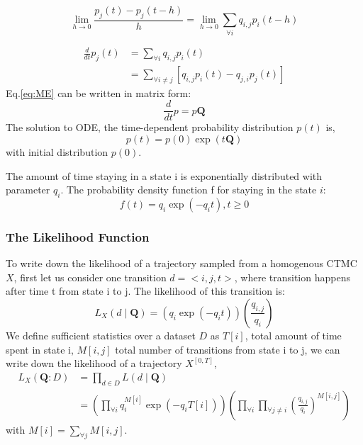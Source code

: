 \begin{equation}
\lim_{h\rightarrow 0} \frac{p_{j}(t) - p_{j}(t-h)}{h} = \lim_{h\rightarrow 0} \sum_{\forall i} q_{i,j} p_{i}(t-h)
\end{equation}

\begin{equation}
\begin{split}
\frac{d}{dt} p_{j}(t) & = \sum_{\forall i} q_{i,j} p_{i}(t) \\ & = \sum_{\forall i \neq j}\left[  q_{i,j} p_{i}(t) - q_{j,i} p_{j}(t) \right]
\end{split}
\label{eq:ME}
\end{equation}
Eq.\ref{eq:ME} can be written in matrix form:
\begin{equation}
\frac{d}{dt} p = p\textbf{Q}
\end{equation}
The solution to ODE, the time-dependent probability distribution $ p(t) $ is, 
\begin{equation}
p(t)=p(0) \exp (t\textbf{Q})
\end{equation}
with initial distribution $ p(0) $.

The amount of time staying in a state i is exponentially distributed with parameter $ q_{i} $. The probability density function f for staying in the state $ i $:
\begin{equation}
f(t)=q_{i} \exp \left(-q_{i} t\right), t\geq 0
\label{eq:f(t)_homo}
\end{equation}
\subsubsection{The Likelihood Function}
To write down the likelihood of a trajectory sampled from a homogenous CTMC $ X $, first let us consider one transition $ d = <i,j,t> $, where transition happens after time t from state i to j. The likelihood of this transition is:
\begin{equation}
L_{X}(d \mid \textbf{Q})=\left(q_{i} \exp \left(-q_{i} t\right)\right)\left(\frac{q_{i,j}}{q_{i}}\right)
\end{equation}
We define sufficient statistics over a dataset $ D $ as $ T[i] $, total amount of time spent in state i, $ M[i,j] $ total number of transitions from state i to j, we can write down the likelihood of a trajectory $  X^{\left[0,T\right] } $,
\begin{equation}
\begin{split}
L_{X}(\textbf{Q} : D) &=  \prod_{d \in D} L(d \mid \textbf{Q}) \\&=\left(\prod_{\forall i} q_{i}^{M[i]} \exp \left(-q_{i} T[i]\right)\right)\left(\prod_{\forall i} \prod_{\forall j \neq i} \left(\frac{q_{i,j}}{q_{i}}\right)^{M\left[i, j\right]}\right)
\label{eq:lh_traj_homo}
\end{split}
\end{equation}
with $ M[i] = \sum_{\forall j} M[i, j] $.


